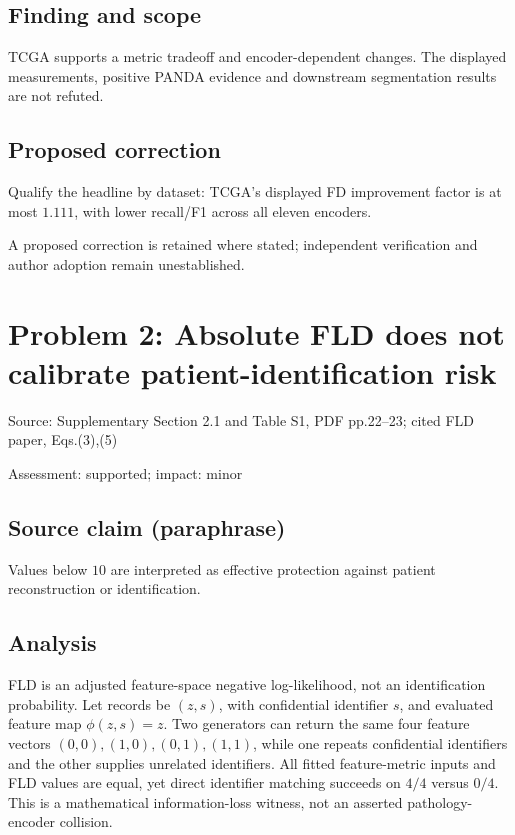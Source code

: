 \documentclass[11pt]{article}
\begin{document}
\subsection*{Finding and scope}

TCGA supports a metric tradeoff and encoder-dependent changes. The displayed measurements, positive PANDA evidence and downstream segmentation results are not refuted.

\subsection*{Proposed correction}

Qualify the headline by dataset: TCGA’s displayed FD improvement factor is at most \(1.111\), with lower recall/F1 across all eleven encoders.

A proposed correction is retained where stated; independent verification and author adoption remain unestablished.

\section*{Problem 2: Absolute FLD does not calibrate patient-identification risk}

Source: Supplementary Section 2.1 and Table S1, PDF pp.22–23; cited FLD paper, Eqs.(3),(5)

Assessment: supported; impact: minor

\subsection*{Source claim (paraphrase)}

Values below \(10\) are interpreted as effective protection against patient reconstruction or identification.

\subsection*{Analysis}

FLD is an adjusted feature-space negative log-likelihood, not an identification probability. Let records be \((z,s)\), with confidential identifier \(s\), and evaluated feature map \(\phi(z,s)=z\). Two generators can return the same four feature vectors \((0,0),(1,0),(0,1),(1,1)\), while one repeats confidential identifiers and the other supplies unrelated identifiers. All fitted feature-metric inputs and FLD values are equal, yet direct identifier matching succeeds on \(4/4\) versus \(0/4\). This is a mathematical information-loss witness, not an asserted pathology-encoder collision.
\end{document}
